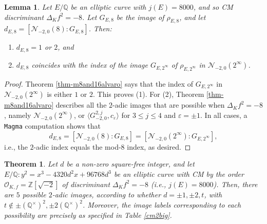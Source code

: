 \documentclass[11pt]{amsart}
\newtheorem{lemma}[defn]{Lemma}
\newtheorem{theorem}[defn]{Theorem}
\theoremstyle{definition}
\newcommand{\Q}{\mathbb Q}
\newcommand{\Z}{\mathbb Z}
\newcommand{\Of}{\mathcal{O}_{K,f}}
\begin{document}
\begin{lemma}\label{lem-disc8index}
    Let $E/\Q$ be an elliptic curve with $j(E)=8000$, and so CM discriminant $\Delta_K f^2 = -8$. Let $G_{E,8}$ be the image of $\rho_{E,8}$, and let $d_{E,8}=[\mathcal{N}_{-2,0}(8):G_{E,8}]$. Then:
    \begin{enumerate}
        \item $d_{E,8}=1$ or $2$, and
        \item $d_{E,8}$ coincides with the index of the image $G_{E,2^\infty}$ of $\rho_{E,2^\infty}$ in $\mathcal{N}_{-2,0}(2^{\infty})$.
    \end{enumerate}
\end{lemma}
\begin{proof}
    Theorem \ref{thm-m8and16alvaro} says that the index of $G_{E, 2^{\infty}}$ in $\mathcal{N}_{-2,0}(2^{\infty})$ is either $1$ or $2$. This proves (1). For (2), Theorem \ref{thm-m8and16alvaro} describes all the $2$-adic images that are possible when $\Delta_K f^2=-8$, namely $\mathcal{N}_{-2,0}(2^{\infty})$, or $\langle G_{-2,0}^{2,j},c_\varepsilon \rangle$ for $3\leq j \leq 4$ and $\varepsilon=\pm 1$. In all cases, a \verb|Magma| computation shows that 
    $$d_{E,8}=[\mathcal{N}_{-2,0}(8):G_{E,8}]=[\mathcal{N}_{-2,0}(2^{\infty}):G_{E,2^\infty}],$$ i.e., the $2$-adic index equals the mod-$8$ index, as desired.
\end{proof}

\begin{theorem}\label{disc8ell2-ver} Let $d$ be a non-zero square-free integer, and let $E/\Q: y^2=x^3 - 4320d^2 x + 96768d^3$ be an elliptic curve with CM by the order $\Of=\Z[\sqrt{-2}]$ of discriminant $\Delta_K f^2=-8$ (i.e., $j(E)=8000$). Then, there are $5$ possible $2$-adic images, according to whether $d = \pm 1, \pm 2, t$, with $t \notin \pm (\Q^\times)^2, \pm 2(\Q^\times)^2$. Moreover, the image labels corresponding to each possibility are precisely as specified in Table \ref{cm2big}.
\end{theorem}
\end{document}
